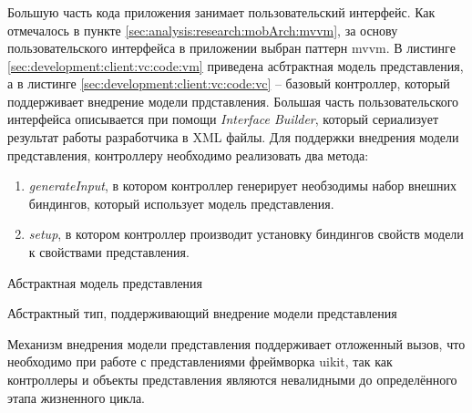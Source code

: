 \subsubsection{}
\label{sec:development:client:vc}

Большую часть кода приложения занимает пользовательский интерфейс. Как отмечалось в пункте \ref{sec:analysis:research:mobArch:mvvm}, за основу пользовательского интерфейса в приложении выбран паттерн \gls{mvvm}. 
В листинге \ref{sec:development:client:vc:code:vm} приведена асбтрактная модель представления, а в листинге \ref{sec:development:client:vc:code:vc} -- базовый контроллер, который поддерживает внедрение модели прдставления. Большая часть пользовательского интерфейса описывается при помощи \textit{Interface Builder}, который сериализует результат работы разработчика в XML файлы. Для поддержки внедрения модели представления, контроллеру необходимо реализовать два метода: 
\begin{enumerate}
	\item \textit{generateInput}, в котором контроллер генерирует необзодимы набор внешних биндингов, который использует модель представления.
	\item \textit{setup}, в котором контроллер производит установку биндингов свойств модели к свойствами представления.
\end{enumerate}

\begin{code}
	
   \caption{Абстрактная модель представления}
   \label{sec:development:client:vc:code:vm}
\end{code}

\begin{code}
	
   \caption{Абстрактный тип, поддерживающий внедрение модели представления}
   \label{sec:development:client:vc:code:vc}
\end{code}

Механизм внедрения модели представления поддерживает отложенный вызов, что необходимо при работе с представлениями фреймворка \gls{uikit}, так как контроллеры и объекты представления являются невалидными до определённого этапа жизненного цикла.